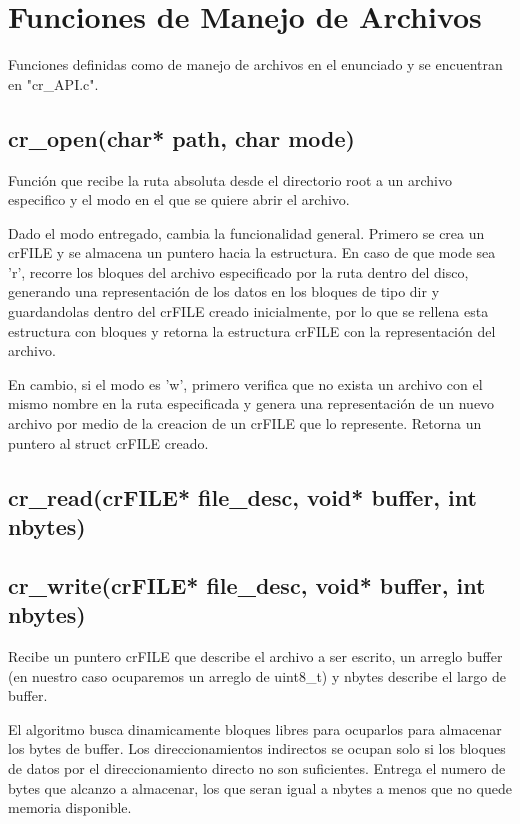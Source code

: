 \documentclass[12pt]{article}
\begin{document}
\section{Funciones de Manejo de Archivos}
Funciones definidas como de manejo de archivos en el enunciado y se encuentran en "cr\_API.c".

\subsection{cr\_open(char* path, char mode)}
Función que recibe la ruta absoluta desde el directorio root a un archivo  especifico y el modo en el que se quiere abrir el archivo.

Dado el modo entregado, cambia la funcionalidad general. Primero se crea un crFILE y se almacena un puntero hacia la estructura. En caso de que mode sea 'r', recorre los bloques del archivo especificado por la ruta dentro del disco, generando una representación de los datos en los bloques de tipo dir y guardandolas dentro del crFILE creado inicialmente, por lo que se rellena esta estructura con bloques y retorna la estructura crFILE con la representación del archivo.

En cambio, si el modo es 'w', primero verifica que no exista un archivo con el mismo nombre en la ruta especificada y genera una representación de un nuevo archivo por medio de la creacion de un crFILE que lo represente. Retorna un puntero al struct crFILE creado.

\subsection{cr\_read(crFILE* file\_desc, void* buffer, int nbytes)}


\subsection{cr\_write(crFILE* file\_desc, void* buffer, int nbytes)}
Recibe un puntero crFILE que describe el archivo a ser escrito, un arreglo buffer (en nuestro caso ocuparemos un arreglo de uint8\_t) y nbytes describe el largo de buffer.

El algoritmo busca dinamicamente bloques libres para ocuparlos para almacenar los bytes de buffer. Los direccionamientos indirectos se ocupan solo si los bloques de datos por el direccionamiento directo no son suficientes. Entrega el numero de bytes que alcanzo a almacenar, los que seran igual a nbytes a menos que no quede memoria disponible.
\end{document}
